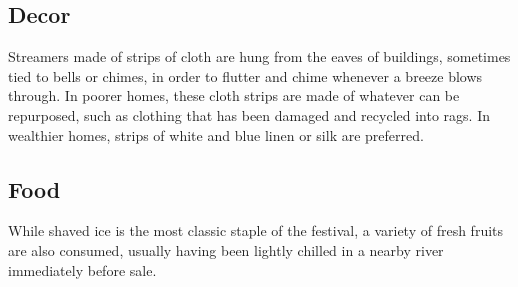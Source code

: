 \documentclass[10pt,a4paper,twoside,twocolumn,openany,bg=print,nodeprecatedcode]{dndbook}
\begin{document}
\subsection{Decor}
Streamers made of strips of cloth are hung from the eaves of buildings, sometimes tied to bells or chimes, in order to flutter and chime whenever a breeze blows through. In poorer homes, these cloth strips are made of whatever can be repurposed, such as clothing that has been damaged and recycled into rags. In wealthier homes, strips of white and blue linen or silk are preferred.
\subsection{Food}
While shaved ice is the most classic staple of the festival, a variety of fresh fruits are also consumed, usually having been lightly chilled in a nearby river immediately before sale.
\end{document}
